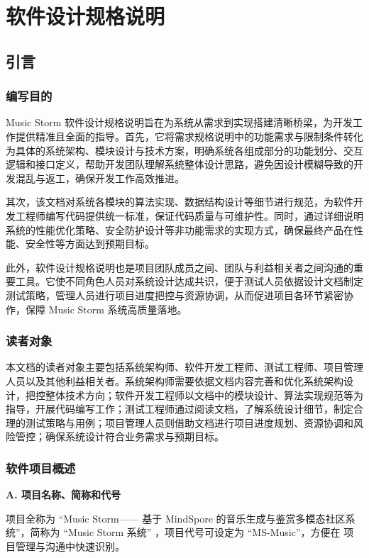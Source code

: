 \documentclass{base}
\numberwithin{figure}{section} %
\begin{document}
\section{软件设计规格说明}

\subsection{引言}

\subsubsection{编写目的}

Music Storm 软件设计规格说明旨在为系统从需求到实现搭建清晰桥梁，为开发工作提供精准且全面的指导。首先，它将需求规格说明中的功能需求与限制条件转化为具体的系统架构、模块设计与技术方案，明确系统各组成部分的功能划分、交互逻辑和接口定义，帮助开发团队理解系统整体设计思路，避免因设计模糊导致的开发混乱与返工，确保开发工作高效推进。

其次，该文档对系统各模块的算法实现、数据结构设计等细节进行规范，为软件开发工程师编写代码提供统一标准，保证代码质量与可维护性。同时，通过详细说明系统的性能优化策略、安全防护设计等非功能需求的实现方式，确保最终产品在性能、安全性等方面达到预期目标。

此外，软件设计规格说明也是项目团队成员之间、团队与利益相关者之间沟通的重要工具。它使不同角色人员对系统设计达成共识，便于测试人员依据设计文档制定测试策略，管理人员进行项目进度把控与资源协调，从而促进项目各环节紧密协作，保障 Music Storm 系统高质量落地。

\subsubsection{读者对象}

本文档的读者对象主要包括系统架构师、软件开发工程师、测试工程师、项目管理人员以及其他利益相关者。系统架构师需要依据文档内容完善和优化系统架构设计，把控整体技术方向；软件开发工程师以文档中的模块设计、算法实现规范等为指导，开展代码编写工作；测试工程师通过阅读文档，了解系统设计细节，制定合理的测试策略与用例；项目管理人员则借助文档进行项目进度规划、资源协调和风险管控；确保系统设计符合业务需求与预期目标。

\subsubsection{软件项目概述}

\textbf{A. 项目名称、简称和代号​}

项目全称为 “Music Storm—— 基于 MindSpore 的音乐生成与鉴赏多模态社区系	统”，简称为 “Music Storm 系统” ，项目代号可设定为 “MS-Music”，方便在	项目管理与沟通中快速识别。​
\end{document}
